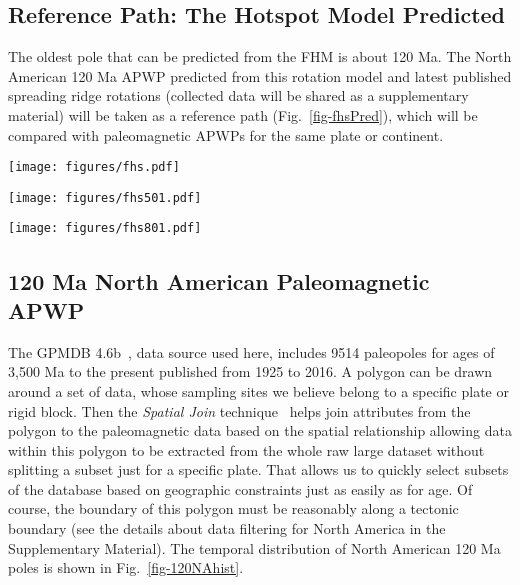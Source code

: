\subsection{Reference Path: The Hotspot Model Predicted}

The oldest pole that can be predicted from the FHM is about 120 Ma. The North
American 120 Ma APWP predicted from this rotation model and
latest published spreading ridge rotations (collected data will be shared as a
supplementary material) will be taken as a reference path
(Fig.~\ref{fig-fhsPred}), which will be compared with paleomagnetic APWPs for
the same plate or continent.

\begin{figure*}
\centering
\texttt{[image: figures/fhs.pdf]}
\caption[120 Ma FHS model predicted APWP of North America]{FHM
predicted 120 Ma APWP for $NAC$ through the North
America\textendash{}Nubia\textendash{}Mantle plate circuit. Its age step is 5
Myr.}\label{fig-fhsPred}
\end{figure*}

\begin{figure*}
\centering
\texttt{[image: figures/fhs501.pdf]}
\caption[120 Ma FHS model predicted APWP of India]{FHM predicted
120 Ma APWP for India through the
India\textendash{}Somalia\textendash{}Nubia\textendash{}Mantle plate circuit.
Its age step is 5 Myr.}\label{fig-fhsPred501}
\end{figure*}

\begin{figure*}
\centering
\texttt{[image: figures/fhs801.pdf]}
\caption[120 Ma FHS model predicted APWP of Australia]{FHM predicted
120 Ma APWP for Australia through the Australia\textendash{}East
Antarctica\textendash{}Somalia\textendash{}Nubia\textendash{}Mantle plate
circuit. Its age step is 5 Myr.}\label{fig-fhsPred801}
\end{figure*}

\subsection{120 Ma North American Paleomagnetic APWP}

The GPMDB 4.6b~\cite{P05}, data source used here, includes 9514 paleopoles for
ages of 3,500 Ma to the present published from 1925 to 2016. A polygon can be
drawn around a set of data, whose sampling sites we believe belong to a specific
plate or rigid block. Then the {\em Spatial Join\/} technique~\cite{J07} helps
join attributes from the polygon to the paleomagnetic data based on the spatial
relationship allowing data within this polygon to be extracted from the whole
raw large dataset without splitting a subset just for a specific plate. That
allows us to quickly select subsets of the database based on geographic
constraints just as easily as for age. Of course, the boundary of this polygon
must be reasonably along a tectonic boundary (see the details about data
filtering for North America in the Supplementary Material). The temporal
distribution of North American 120 Ma poles is shown in
Fig.~\ref{fig-120NAhist}.

